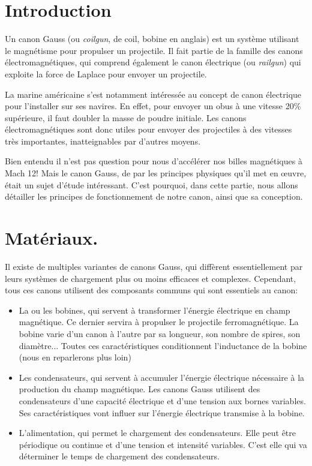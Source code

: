 \section{Introduction}
Un canon Gauss (ou \emph{coilgun}, de coil, bobine en anglais) est un
système utilisant le magnétisme pour propulser un projectile.
Il fait partie de la famille des canons électromagnétiques, qui
comprend également le canon électrique (ou \emph{railgun}) qui exploite
la force de Laplace pour envoyer un projectile.

La marine américaine s'est notamment intéressée au concept de
canon électrique pour l'installer sur ses navires. En effet,
pour envoyer un obus à une vitesse 20\% supérieure, il faut
doubler la masse de poudre initiale. Les canons
électromagnétiques sont donc utiles pour envoyer des
projectiles à des vitesses très importantes, inatteignables par
d'autres moyens.

Bien entendu il n'est pas question pour nous d'accélérer nos
billes magnétiques à Mach 12! Mais le canon Gauss, de par les
principes physiques qu'il met en œuvre, était un sujet d'étude
intéressant. C'est pourquoi, dans cette partie, nous allons
détailler les principes de fonctionnement de notre canon,
ainsi que sa conception.

\section{Matériaux.}
Il existe de multiples variantes de canons Gauss, qui diffèrent
essentiellement par leurs systèmes de chargement plus ou moins 
efficaces et complexes. Cependant, tous ces canons utilisent
des composants communs qui sont essentiels au canon:
\begin{itemize}
	\item La ou les bobines, qui servent à transformer l'énergie
		électrique en champ magnétique. Ce dernier servira à propulser
		le projectile ferromagnétique. La bobine varie d'un canon à
		l'autre par sa longueur, son nombre de spires, son diamètre...
		Toutes ces caractéristiques conditionnent l'inductance de la
		bobine (nous en reparlerons plus loin)

	\item Les condensateurs, qui servent à accumuler l'énergie électrique
		nécessaire à la production du champ magnétique. Les canons
		Gauss utilisent des condensateurs d'une capacité électrique et
		d'une tension aux bornes variables. Ses caractéristiques vont
		influer sur l'énergie électrique transmise à la bobine.

	\item L'alimentation, qui permet le chargement des condensateurs. Elle
		peut être périodique ou continue et d'une tension et intensité
		variables. C'est elle qui va déterminer le temps de chargement
		des condensateurs.
\end{itemize}

